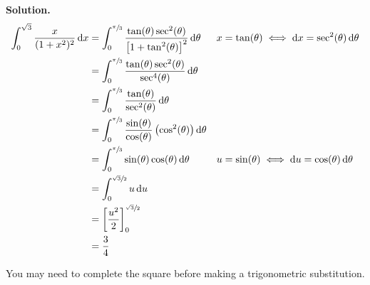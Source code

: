 \begin{Example}{}{}
\begin{enumerate}[label=(\roman*)]
              \textbf{Solution.}
              \begin{align*}
                  \int_{0}^{\sqrt{3}} \frac{x}{(1+x^2)^2} \odif{x}
                   & =\int_{0}^{\sfrac{\pi}{3}}
                  \frac{\tan(\theta)\sec^2(\theta)}{\left[ 1+\tan^2(\theta) \right]^2} \odif{\theta}
                   &                                                                                                         & x=\tan(\theta)\iff \odif{x}=\sec^2(\theta)\odif{\theta}                                                         \\
                   & =\int_{0}^{\sfrac{\pi}{3}} \frac{\tan(\theta)\sec^2(\theta)}{\sec^4(\theta)} \odif{\theta}                                                                                                                                \\
                   & =\int_{0}^{\sfrac{\pi}{3}} \frac{\tan(\theta)}{\sec^2(\theta)} \odif{\theta}                                                                                                                                              \\
                   & =\int_{0}^{\sfrac{\pi}{3}} \frac{\sin(\theta)}{\cos(\theta)} \left( \cos^2(\theta) \right)\odif{\theta}                                                                                                                   \\
                   & =\int_{0}^{\sfrac{\pi}{3}}\sin(\theta)\cos(\theta)\odif{\theta}                                         &                                                         & u=\sin(\theta)\iff \odif{u}=\cos(\theta)\odif{\theta} \\
                   & =\int_{0}^{\sfrac{\sqrt{3}}{2}} u\odif{u}                                                                                                                                                                                 \\
                   & =\left[\frac{u^2}{2} \right]^{\sfrac{\sqrt{3}}{2}}_0                                                                                                                                                                      \\
                   & =\frac{3}{4}
              \end{align*}
    \end{enumerate}
\end{Example}
\begin{Remark}{}{}
    You may need to complete the square before making a trigonometric substitution.
\end{Remark}
